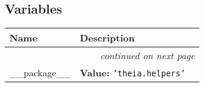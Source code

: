 
  \subsection{Variables}

    \vspace{-1cm}
\hspace{\varindent}\begin{longtable}{|p{\varnamewidth}|p{\vardescrwidth}|l}
\cline{1-2}
\cline{1-2} \centering \textbf{Name} & \centering \textbf{Description}& \\
\cline{1-2}
\endhead\cline{1-2}\multicolumn{3}{r}{\small\textit{continued on next page}}\\\endfoot\cline{1-2}
\endlastfoot\raggedright \_\-\_\-p\-a\-c\-k\-a\-g\-e\-\_\-\_\- & \raggedright \textbf{Value:} 
{\tt \texttt{'}\texttt{theia.helpers}\texttt{'}}&\\
\cline{1-2}
\end{longtable}

